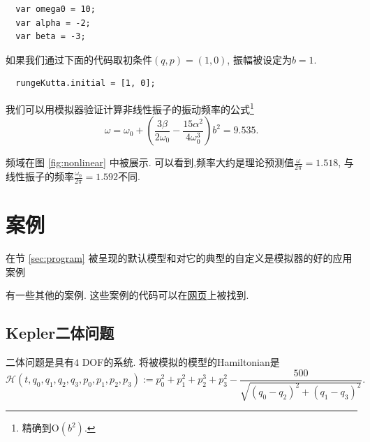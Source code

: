 \documentclass[12pt]{article}
\begin{document}
\begin{verbatim}
  var omega0 = 10;
  var alpha = -2;
  var beta = -3;
\end{verbatim}

如果我们通过下面的代码取初条件$\left(q,p\right)=\left(1,0\right)$,
振幅被设定为$b=1$.

\begin{verbatim}
  rungeKutta.initial = [1, 0];
\end{verbatim}

我们可以用模拟器验证计算非线性振子的振动频率的公式\cite[p. 87]{landau1976mechanics}\footnote{
  精确到$\mathrm O\left(b^2\right)$.
}
\begin{equation*}
  \omega=\omega_0+\left(\frac{3\beta}{2\omega_0}-\frac{15\alpha^2}{4\omega_0^3}\right)b^2=9.535.
\end{equation*}

频域在图 \ref{fig:nonlinear} 中被展示.
可以看到,频率大约是理论预测值$\frac\omega{2\pi}=1.518$,
与线性振子的频率$\frac{\omega_0}{2\pi}=1.592$不同.

\section{案例}
\label{sec:examples}

在节 \ref{sec:program} 被呈现的默认模型和对它的典型的自定义是模拟器的好的应用案例

有一些其他的案例.
这些案例的代码可以在\href{https://ulysseszh.github.io/rpg/mechsimul2/examples.html}{网页}上被找到.

\subsection{Kepler二体问题}

二体问题是具有$4$ DOF的系统.
将被模拟的模型的Hamiltonian是
\begin{equation*}
  \mathcal H\left(t,q_0,q_1,q_2,q_3,p_0,p_1,p_2,p_3\right):=
  p_0^2+p_1^2+p_2^3+p_3^2-\frac{500}{\sqrt{\left(q_0-q_2\right)^2+\left(q_1-q_3\right)^2}}.
\end{equation*}
\end{document}
